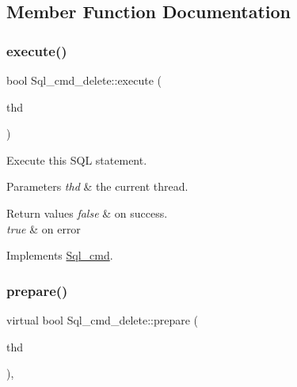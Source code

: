 \subsection{Member Function Documentation}
\mbox{\label{classSql__cmd__delete_aa04524eb8b0ecf5f8059fdd176990781}} 
\subsubsection{\texorpdfstring{execute()}{execute()}}
{\footnotesize\ttfamily bool Sql\+\_\+cmd\+\_\+delete\+::execute (\begin{DoxyParamCaption}\item[{T\+HD $\ast$}]{thd }\end{DoxyParamCaption})\hspace{0.3cm}{\ttfamily [virtual]}}

Execute this S\+QL statement. 
\begin{DoxyParams}{Parameters}
{\em thd} & the current thread. \\
\hline
\end{DoxyParams}

\begin{DoxyRetVals}{Return values}
{\em false} & on success. \\
\hline
{\em true} & on error \\
\hline
\end{DoxyRetVals}


Implements \mbox{\hyperlink{classSql__cmd_a213367b79b551296fbb7790f2a3732fb}{Sql\+\_\+cmd}}.

\mbox{\label{classSql__cmd__delete_ad761a1c8d8c0412fddd38a3303986806}} 
\subsubsection{\texorpdfstring{prepare()}{prepare()}}
{\footnotesize\ttfamily virtual bool Sql\+\_\+cmd\+\_\+delete\+::prepare (\begin{DoxyParamCaption}\item[{T\+HD $\ast$}]{thd }\end{DoxyParamCaption})\hspace{0.3cm}{\ttfamily [inline]}, {\ttfamily [virtual]}}

